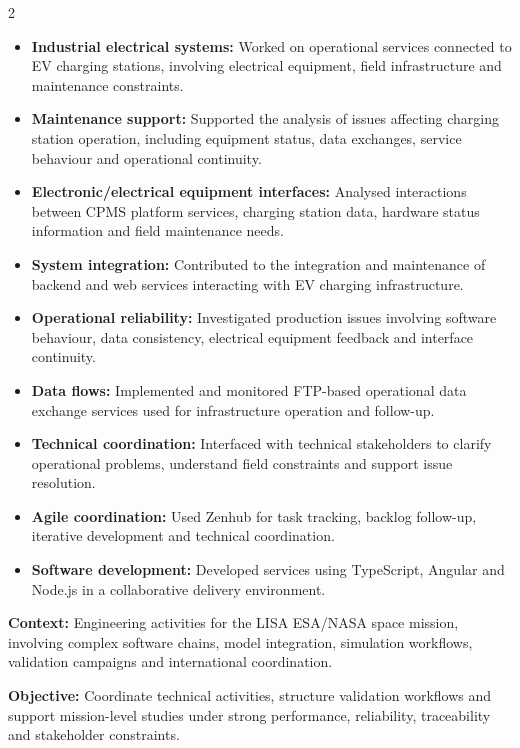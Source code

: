 \documentclass[8pt,a4paper,ragged2e,withhyper]{altacv}
\begin{document}
\begin{paracol}{2}
\begin{itemize}
  \item \textbf{Industrial electrical systems:} Worked on operational services connected to EV charging stations, involving electrical equipment, field infrastructure and maintenance constraints.
  \item \textbf{Maintenance support:} Supported the analysis of issues affecting charging station operation, including equipment status, data exchanges, service behaviour and operational continuity.
  \item \textbf{Electronic/electrical equipment interfaces:} Analysed interactions between CPMS platform services, charging station data, hardware status information and field maintenance needs.
  \item \textbf{System integration:} Contributed to the integration and maintenance of backend and web services interacting with EV charging infrastructure.
  \item \textbf{Operational reliability:} Investigated production issues involving software behaviour, data consistency, electrical equipment feedback and interface continuity.
  \item \textbf{Data flows:} Implemented and monitored FTP-based operational data exchange services used for infrastructure operation and follow-up.
  \item \textbf{Technical coordination:} Interfaced with technical stakeholders to clarify operational problems, understand field constraints and support issue resolution.
  \item \textbf{Agile coordination:} Used Zenhub for task tracking, backlog follow-up, iterative development and technical coordination.
  \item \textbf{Software development:} Developed services using TypeScript, Angular and Node.js in a collaborative delivery environment.
\end{itemize}

\divider


\textbf{Context:} Engineering activities for the LISA ESA/NASA space mission, involving complex software chains, model integration, simulation workflows, validation campaigns and international coordination.

\textbf{Objective:} Coordinate technical activities, structure validation workflows and support mission-level studies under strong performance, reliability, traceability and stakeholder constraints.


\end{paracol}
\end{document}
